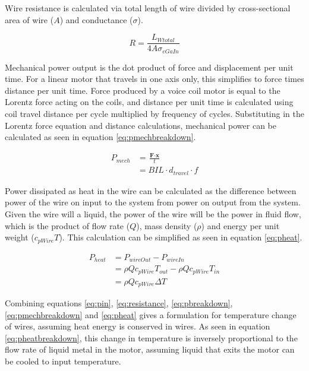 \documentclass[a4paper,12pt]{article}
\begin{document}
Wire resistance is calculated via total length of wire divided by cross-sectional area of wire ($A$) and conductance ($\sigma$).

\begin{equation}\label{eq:resistance}
    R=\frac{L_{Wtotal}}{4A\sigma_{eGaIn}}
\end{equation}

Mechanical power output is the dot product of force and displacement per unit time. For a linear motor that travels in one axis only, this simplifies to force times distance per unit time. Force produced by a voice coil motor is equal to the Lorentz force acting on the coils, and distance per unit time is calculated using coil travel distance per cycle multiplied by frequency of cycles. Substituting in the Lorentz force equation and distance calculations, mechanical power can be calculated as seen in equation \ref{eq:pmechbreakdown}.

\begin{equation}\label{eq:pmechbreakdown}
    \begin{split}
   		P_{mech} & = \frac{\textbf{F} \cdot \textbf{x}}{t} \\
    	& = BIL\cdot d_{travel} \cdot f
    \end{split}
\end{equation}

Power dissipated as heat in the wire can be calculated as the difference between power of the wire on input to the system from power on output from the system. Given the wire will a liquid, the power of the wire will be the power in fluid flow, which is the product of flow rate ($Q$), mass density ($\rho$) and energy per unit weight ($c_{pWire}T$). This calculation can be simplified as seen in equation \ref{eq:pheat}.

\begin{equation}\label{eq:pheat}
    \begin{split}
    	P_{heat} & = P_{wireOut} - P_{wireIn} \\
		& = \rho Q c_{pWire} T_{out} - \rho Q c_{pWire} T_{in} \\
		& = \rho Q c_{pWire} \Delta T
    \end{split}
\end{equation}

Combining equations \ref{eq:pin}, \ref{eq:resistance}, \ref{eq:pbreakdown}, \ref{eq:pmechbreakdown} and \ref{eq:pheat} gives a formulation for temperature change of wires, assuming heat energy is conserved in wires. As seen in equation \ref{eq:pheatbreakdown}, this change in temperature is inversely proportional to the flow rate of liquid metal in the motor, assuming liquid that exits the motor can be cooled to input temperature.
\end{document}
